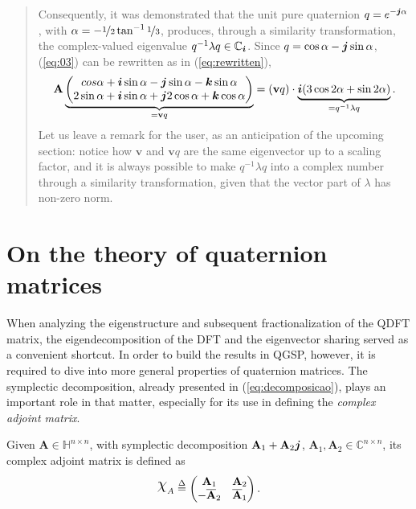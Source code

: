 \begin{quotation}
\begin{example}
        Consequently, it was demonstrated that the unit pure quaternion $ q = e^{- \boldsymbol{j} \alpha} $, with $ \alpha = - \displaystyle \nicefrac{1}{2} \tan^{-1} \nicefrac{1}{3} $, produces, through a similarity transformation, the complex-valued eigenvalue $ q^{-1} \lambda q \in \mathbb{C}_{\boldsymbol{i}}$. Since $q = \cos \alpha - \boldsymbol{j} \sin \alpha $, (\ref{eq:03}) can be rewritten as in (\ref{eq:rewritten}),
        \begin{equation}
            \mathbf{A} \underbrace{\begin{pmatrix}
                    cos \alpha + \boldsymbol{i} \sin \alpha - \boldsymbol{j} \sin \alpha - \boldsymbol{k} \sin \alpha \\
                    2 \sin \alpha + \boldsymbol{i} \sin \alpha + \boldsymbol{j} 2 \cos \alpha + \boldsymbol{k} \cos \alpha
                \end{pmatrix}}_{= \mathbf{v} q} =
            (\mathbf{v} q) \cdot \underbrace{\boldsymbol{i} (3 \cos 2\alpha + \sin 2\alpha)}_{= q^{-1} \lambda q}.
        \end{equation}
        Let us leave a remark for the user, as an anticipation of the upcoming section: notice how $\mathbf{v}$ and $\mathbf{v}q$ are the same eigenvector up to a scaling factor, and it is always possible to make $q^{-1} \lambda q$ into a complex number through a similarity transformation, given that the vector part of $\lambda$ has non-zero norm.
    \end{example}
\end{quotation}


\section{On the theory of quaternion matrices}

When analyzing the eigenstructure and subsequent fractionalization of the QDFT matrix, the eigendecomposition of the DFT and the eigenvector sharing served as a convenient shortcut. In order to build the results in QGSP, however, it is required to dive into more general properties of quaternion matrices. The symplectic decomposition, already presented in (\ref{eq:decomposicao}), plays an important role in that matter, especially for its use in defining the \textit{complex adjoint matrix}.

\begin{definition}
    \label{def:complexadjoint}
    Given $ \mathbf{A} \in \mathbb{H}^{n \times n} $, with symplectic decomposition $ \mathbf{A}_1 + \mathbf{A}_2 \boldsymbol{j}$, $ \mathbf{A}_1,\mathbf{A}_2 \in \mathbb{C}^{n \times n} $, its complex adjoint matrix is defined as
    \begin{equation}
        \rchi_{A} \overset{\Delta}{=}
        \begin{pmatrix}
            \mathbf{A}_1              & \mathbf{A}_2            \\
            - \overline{\mathbf{A}}_2 & \overline{\mathbf{A}}_1
        \end{pmatrix}.
    \end{equation}
\end{definition}

